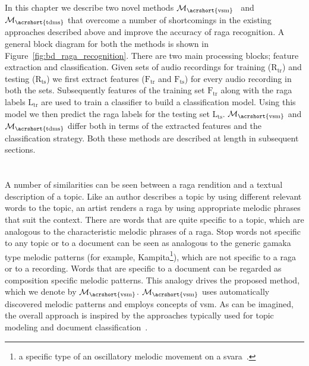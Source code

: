In this chapter we describe two novel methods $\mathcal{M}_\mathrm{\acrshort{vsm}}$~ and $\mathcal{M}_\mathrm{\acrshort{tdms}}$ that overcome a number of shortcomings in the existing approaches described above and improve the accuracy of \gls{raga} recognition. A general block diagram for both the methods is shown in Figure~\ref{fig:bd_raga_recognition}. There are two main processing blocks; feature extraction and classification. Given sets of audio recordings for training ($\mathrm{R}_\mathrm{tr}$) and testing ($\mathrm{R}_\mathrm{ts}$) we first extract features ($\mathrm{F}_\mathrm{tr}$ and $\mathrm{F}_\mathrm{ts}$) for every audio recording in both the sets. Subsequently features of the training set $\mathrm{F}_\mathrm{tr}$ along with the \gls{raga} labels $\mathrm{L}_\mathrm{tr}$ are used to train a classifier to build a classification model. Using this model we then predict the \gls{raga} labels for the testing set $\mathrm{L}_\mathrm{ts}$. $\mathcal{M}_\mathrm{\acrshort{vsm}}$ and $\mathcal{M}_\mathrm{\acrshort{tdms}}$ differ both in terms of the extracted features and the classification strategy. Both these methods are described at length in subsequent sections.


\section{}
\label{sec:phrase_based_feature_extraction}


A number of similarities can be seen between a \gls{raga} rendition and a textual description of a topic. Like an author describes a topic by using different relevant words to the topic, an artist renders a \gls{raga} by using appropriate melodic phrases that suit the context. There are words that are quite specific to a topic, which are analogous to the characteristic melodic phrases of a \gls{raga}. Stop words not specific to any topic or to a document can be seen as analogous to the generic gamaka type melodic patterns (for example, Kampita\footnote{a specific type of an oscillatory melodic movement on a svara~\cite{krishna2012carnatic}.}), which are not specific to a \gls{raga} or to a recording. Words that are specific to a document can be regarded as composition specific melodic patterns. This analogy drives the proposed method, which we denote by $\mathcal{M}_\mathrm{\acrshort{vsm}}$. $\mathcal{M}_\mathrm{\acrshort{vsm}}$ uses automatically discovered melodic patterns and employs concepts of \gls{vsm}. As can be imagined, the overall approach is inspired by the approaches typically used for topic modeling and document classification~.

